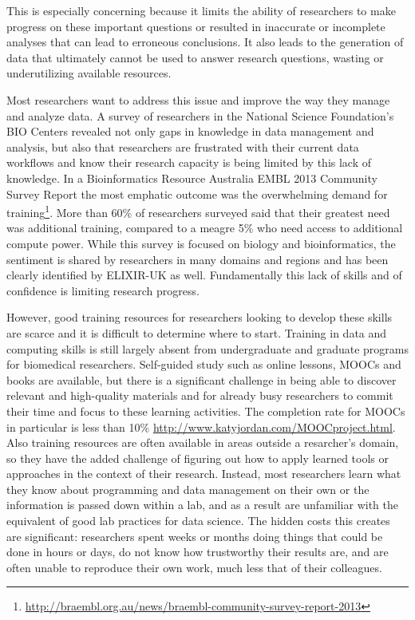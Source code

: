 \documentclass[15]{idcc}
\begin{document}
This is especially concerning because it limits the ability of researchers to make progress on these important questions
 or resulted in inaccurate or incomplete analyses that can lead to erroneous conclusions. It also
leads to the generation of data that ultimately cannot be used to answer research questions, wasting
or underutilizing available resources.

Most researchers want to address this issue and improve the way they manage and analyze data.
A survey of researchers in the National Science Foundation's BIO Centers revealed not only gaps in knowledge in data management and analysis, but also that researchers are frustrated with
their current data workflows and know their research capacity is being limited by this lack of knowledge. In a Bioinformatics Resource Australia EMBL 2013 Community Survey Report the most emphatic outcome was the overwhelming demand for training\footnote{\url{http://braembl.org.au/news/braembl-community-survey-report-2013}}. More than 60\% of researchers surveyed said that their greatest need was additional training, compared to a meagre 5\% who need access to additional compute power.  While this survey is focused on biology and bioinformatics, the sentiment is shared by researchers in many domains and regions and has been clearly identified by ELIXIR-UK as well. Fundamentally this lack of skills and of confidence is limiting research progress.

However, good training resources for researchers looking to develop these skills are scarce and it is difficult to determine where to start. Training in data and computing skills is still
largely absent from undergraduate and graduate programs for biomedical researchers. Self-guided study such as online lessons,
MOOCs and books are available, but there is a significant challenge in being able to discover relevant and high-quality
 materials and for already busy researchers to commit their time and focus to these learning activities. The completion rate for MOOCs in particular is less than 10\% \url{http://www.katyjordan.com/MOOCproject.html}. Also training resources are often available in areas outside a resarcher's domain, so they have the added challenge of figuring out how to apply learned tools or approaches in the context of their research. Instead, most researchers
learn what they know about programming and data management on their own or the information is passed down within a lab,
and as a result are unfamiliar with the equivalent of good lab practices for data science.  The hidden costs this creates are significant:
researchers spent weeks or months doing things that could be done in hours or days, do not know how trustworthy their results are, and
are often unable to reproduce their own work, much less that of their colleagues.
\end{document}
